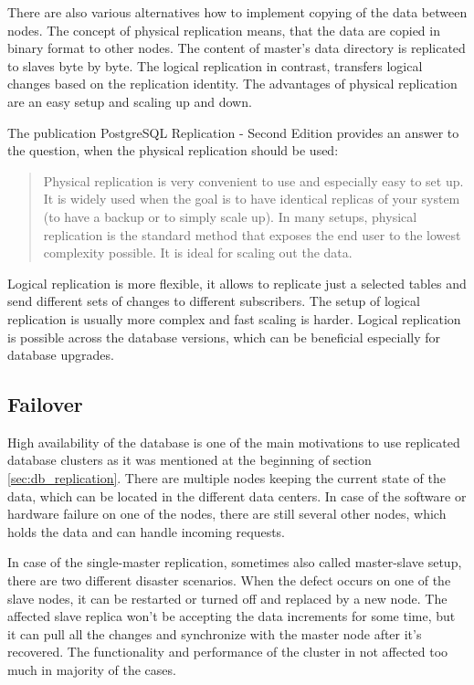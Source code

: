 \documentclass[
  digital, %
  twoside, %
  table,   %
  lof,     %
  lot,     %
]{fithesis3}
\begin{document}
There are also various alternatives how to implement copying of the data between nodes. The concept of physical replication means, that the data are copied in binary format to other nodes. The content of master's data directory is replicated to slaves byte by byte. The logical replication in contrast, transfers logical changes based on the replication identity. The advantages of physical replication are an easy setup and scaling up and down.

The publication PostgreSQL Replication - Second Edition provides an answer to the question, when the physical replication should be used:
\begin{quote}
Physical replication is very convenient to use and especially easy to set up. It is
widely used when the goal is to have identical replicas of your system (to have a
backup or to simply scale up).
In many setups, physical replication is the standard method that exposes the end
user to the lowest complexity possible. It is ideal for scaling out the data. \cite[p. 10]{pg}
\end{quote}

Logical replication is more flexible, it allows to replicate just a selected tables and send different sets of changes to different subscribers. The setup of logical replication is usually more complex and fast scaling is harder. Logical replication is possible across the database versions, which can be beneficial especially for database upgrades.

\subsection{Failover} \label{sec:failover}
High availability of the database is one of the main motivations to use replicated database clusters as it was mentioned at the beginning of section \ref{sec:db_replication}. There are multiple nodes keeping the current state of the data, which can be located in the different data centers. In case of the software or hardware failure on one of the nodes, there are still several other nodes, which holds the data and can handle incoming requests.

In case of the single-master replication, sometimes also called master-slave setup, there are two different disaster scenarios. When the defect occurs on one of the slave nodes, it can be restarted or turned off and replaced by a new node. The affected slave replica won't be accepting the data increments for some time, but it can pull all the changes and synchronize with the master node after it's recovered. The functionality and performance of the cluster in not affected too much in majority of the cases.
\end{document}
